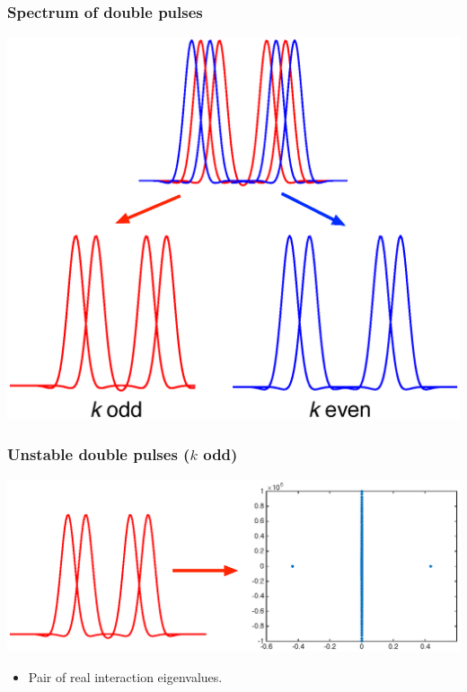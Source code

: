 \documentclass[16pt]{beamer}
\begin{document}
\begin{frame}
	\frametitle{Spectrum of double pulses}
	\begin{center}
		\includegraphics[width=0.8\linewidth]{images/dpsplit}
	\end{center}
\end{frame}

\begin{frame}
	\frametitle{Unstable double pulses ($k$ odd)}
	\begin{center}
		\includegraphics[width=1\linewidth]{images/doubleunstableeig}
	\end{center}
	\begin{itemize}
	\item Pair of real interaction eigenvalues.
	\end{itemize}
\end{frame}
\end{document}
